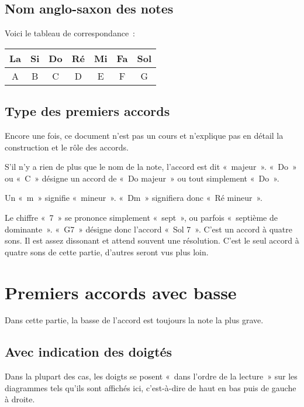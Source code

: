 \documentclass[11pt]{article}
\begin{document}
\subsection{Nom anglo-saxon des notes}

Voici le tableau de correspondance~:

\begin{tabular}{ | c | c | c | c | c | c | c | }
    \hline
    La & Si & Do & Ré & Mi & Fa & Sol \\
    \hline
    A & B & C & D & E & F & G \\
    \hline
\end{tabular}

\subsection{Type des premiers accords}

Encore une fois, ce document n’est pas un cours et n’explique pas en détail
la construction et le rôle des accords.

S’il n’y a rien de plus que le nom de la note, l’accord est dit «~majeur~».
«~Do~» ou «~C~» désigne un accord de «~Do majeur~» ou tout simplement «~Do~».

Un «~m~» signifie «~mineur~». «~Dm~» signifiera donc «~Ré mineur~».

Le chiffre «~7~» se prononce simplement «~sept~», ou parfois «~septième de
dominante~». «~G7~» désigne donc l’accord «~Sol 7~».
C’est un accord à quatre sons. Il est assez dissonant et
attend souvent une résolution. C’est le seul accord à quatre sons de cette
partie, d’autres seront vus plus loin.

\section{Premiers accords avec basse}

Dans cette partie, la basse de l’accord est toujours la note la plus grave.

\subsection{Avec indication des doigtés}

Dans la plupart des cas, les doigts se posent «~dans l’ordre de la lecture~»
sur les diagrammes tels qu’ils sont affichés ici, c’est-à-dire de haut en bas
puis de gauche à droite. 

\end{document}
